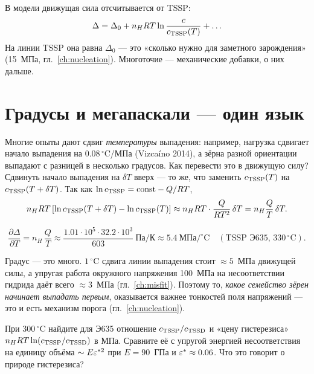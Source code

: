 В модели движущая сила отсчитывается от TSSP:
\begin{equation}
\Delta=\Delta_0+n_H RT\ln\frac{c}{c_{\TSSP}(T)}+\dots
\label{eq:delta_chem}
\end{equation}
На линии TSSP она равна $\Delta_0$ --- это «сколько нужно для заметного зарождения» (15~МПа,
гл.~\ref{ch:nucleation}). Многоточие --- механические добавки, о них дальше.

\section{Градусы и мегапаскали --- один язык}

Многие опыты дают сдвиг \emph{температуры} выпадения: например, нагрузка сдвигает начало выпадения
на $0.08\,^\circ$C/МПа (Vizcaíno 2014), а зёрна разной ориентации выпадают с разницей в
несколько градусов. Как перевести это в движущую силу? Сдвинуть начало выпадения на $\delta T$
вверх --- то же, что заменить $c_{\mathrm{TSSP}}(T)$ на $c_{\mathrm{TSSP}}(T+\delta T)$. Так как
$\ln c_{\mathrm{TSSP}}=\text{const}-Q/RT$,
\[
n_HRT\left[\ln c_{\mathrm{TSSP}}(T+\delta T)-\ln c_{\mathrm{TSSP}}(T)\right]\approx n_HRT\cdot\frac{Q}{RT^2}\,\delta T
=n_H\frac{Q}{T}\,\delta T .
\]

\begin{keyf}
\[
\frac{\partial\Delta}{\partial T}=n_H\,\frac{Q}{T}\approx\frac{1.01\cdot10^5\cdot32.2\cdot10^3}{603}\ \text{Па/К}
\approx5.4\ \text{МПа}/^\circ\text{C}\quad(\text{TSSP Э635, }330\,^\circ\text{C}).
\]
\end{keyf}


\begin{idea}
Градус --- это много. $1\,^\circ$C сдвига линии выпадения стоит $\approx5$~МПа движущей силы,
а упругая работа окружного напряжения 100~МПа на несоответствии гидрида даёт всего
$\approx3$~МПа (гл.~\ref{ch:misfit}). Поэтому то, \emph{какое семейство зёрен начинает выпадать
первым}, оказывается важнее тонкостей поля напряжений --- это и есть механизм порога
(гл.~\ref{ch:nucleation}).
\end{idea}

\begin{exercise}
При 300\,$^\circ$C найдите для Э635 отношение $c_{\mathrm{TSSP}}/c_{\mathrm{TSSD}}$ и «цену гистерезиса»
$n_HRT\ln(c_{\mathrm{TSSP}}/c_{\mathrm{TSSD}})$ в МПа. Сравните её с упругой энергией несоответствия на единицу
объёма $\sim E\varepsilon^{*2}$ при $E=90$~ГПа и $\varepsilon^*\approx0.06$. Что это говорит о природе гистерезиса?
\end{exercise}

